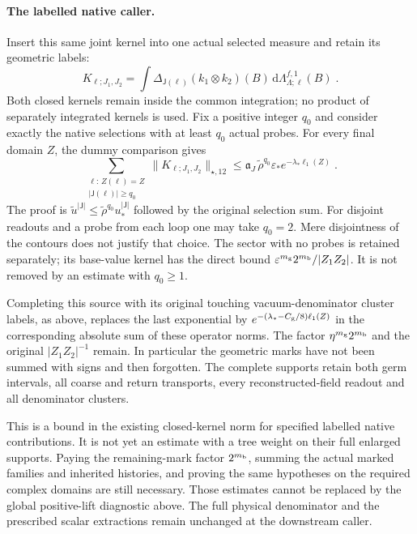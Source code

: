 \documentclass[11pt]{article}
\newcommand{\dd}{\mathrm{d}}
\begin{document}
\paragraph{The labelled native caller.}
Insert this same joint kernel into one actual selected
measure and retain its geometric labels:
\begin{equation}\label{eq:c8-fourth-fixed-mark-selected}
    K_{\ell;J_1,J_2}
        =\int
            \Delta_{\mathsf J(\ell)}(k_1\otimes k_2)(B)\,
                \dd\Lambda^{f,1}_{\Lambda;\ell}(B)\;.
\end{equation}
Both closed kernels remain inside the common integration;
no product of separately integrated kernels is used.
Fix a positive integer $q_0$ and consider exactly the native
selections with at least $q_0$ actual probes. For every final
domain $Z$, the dummy comparison gives
\begin{equation}\label{eq:c8-fourth-fixed-mark-root}
    \sum_{\substack{\ell:\,Z(\ell)=Z\\
        |\mathsf J(\ell)|\geq q_0}}
        \|K_{\ell;J_1,J_2}\|_{\star,12}
        \leq
        \mathfrak a_J\,\widetilde\rho^{q_0}
            \varepsilon_*e^{-\lambda_*\ell_1(Z)}\;.
\end{equation}
The proof is
$\widetilde u^{|\mathsf J|}
\leq\widetilde\rho^{q_0}u_*^{|\mathsf J|}$
followed by the original selection sum.
For disjoint readouts and a probe from each loop one may
take $q_0=2$. Mere disjointness of the contours does not
justify that choice.
The sector with no probes is retained separately; its
base-value kernel has the direct bound
$\varepsilon^{m_{\rm g}}2^{m_{\rm b}}/|Z_1Z_2|$.
It is not removed by an estimate with $q_0\geq1$.

Completing this source with its original touching
vacuum-denominator cluster labels, as above, replaces the
last exponential by
$e^{-(\lambda_*-C_{\rm g}/8)\ell_1(Z)}$ in the corresponding
absolute sum of these operator norms. The factor
$\eta^{m_{\rm g}}2^{m_{\rm b}}$ and the original
$|Z_1Z_2|^{-1}$ remain. In particular the geometric marks
have not been summed with signs and then forgotten.
The complete supports retain both germ intervals, all
coarse and return transports, every reconstructed-field
readout and all denominator clusters.

This is a bound in the existing closed-kernel norm for
specified labelled native contributions. It is not yet an
estimate with a tree weight on their full enlarged supports.
Paying the remaining-mark factor $2^{m_{\rm b}}$, summing
the actual marked families and inherited histories, and
proving the same hypotheses on the required complex
domains are still necessary. Those estimates cannot be
replaced by the global positive-lift diagnostic above.
The full physical denominator and the prescribed scalar
extractions remain unchanged at the downstream caller.
\end{document}
